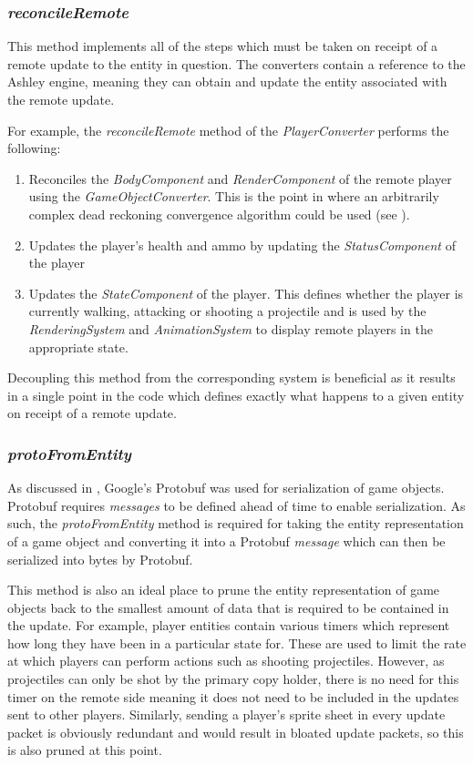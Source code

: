 \subsubsection{\textit{reconcileRemote}}
This method implements all of the steps which must be taken on receipt of a remote update to the entity in question. The converters contain a reference to the Ashley engine, meaning they can obtain and update the entity associated with the remote update.

For example, the \textit{reconcileRemote} method of the \textit{PlayerConverter} performs the following:
\begin{enumerate}
    \item Reconciles the \textit{BodyComponent} and \textit{RenderComponent} of the remote player using the \textit{GameObjectConverter}. This is the point in \game{} where an arbitrarily complex dead reckoning convergence algorithm could be used (see ).
    \item Updates the player's health and ammo by updating the \textit{StatusComponent} of the player
    \item Updates the \textit{StateComponent} of the player. This defines whether the player is currently walking, attacking or shooting a projectile and is used by the \textit{RenderingSystem} and \textit{AnimationSystem} to display remote players in the appropriate state. 
\end{enumerate}

Decoupling this method from the corresponding system is beneficial as it results in a single point in the code which defines exactly what happens to a given entity on receipt of a remote update.

\subsubsection{\textit{protoFromEntity}}
As discussed in , Google's Protobuf \cite{proto} was used for serialization of game objects. Protobuf requires \textit{messages} to be defined ahead of time to enable serialization. As such, the \textit{protoFromEntity} method is required for taking the entity representation of a game object and converting it into a Protobuf \textit{message} which can then be serialized into bytes by Protobuf. 

This method is also an ideal place to prune the entity representation of game objects back to the smallest amount of data that is required to be contained in the update. For example, player entities contain various timers which represent how long they have been in a particular state for. These are used to limit the rate at which players can perform actions such as shooting projectiles. However, as projectiles can only be shot by the primary copy holder, there is no need for this timer on the remote side meaning it does not need to be included in the updates sent to other players. Similarly, sending a player's sprite sheet in every update packet is obviously redundant and would result in bloated update packets, so this is also pruned at this point.

